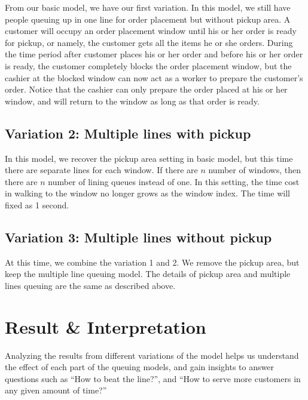 \documentclass[a4paper]{article}
\begin{document}
From our basic model, we have our first variation. In this model, we still have people queuing up in one line for order placement but without pickup area. A customer will occupy an order placement window until his or her order is ready for pickup, or namely, the customer gets all the items he or she orders. During the time period after customer places his or her order and before his or her order is ready, the customer completely blocks the order placement window, but the cashier at the blocked window can now act as a worker to prepare the customer's order. Notice that the cashier can only prepare the order placed at his or her window, and will return to the window as long as that order is ready.

\subsection{Variation 2: Multiple lines with pickup}

In this model, we recover the pickup area setting in basic model, but this time there are separate lines for each window. If there are $n$ number of windows, then there are $n$ number of lining queues instead of one. In this setting, the time cost in walking to the window no longer grows as the window index. The time will fixed as 1 second.

\subsection{Variation 3: Multiple lines without pickup}

At this time, we combine the variation 1 and 2. We remove the pickup area, but keep the multiple line queuing model. The details of pickup area and multiple lines queuing are the same as described above.

\newpage
\section{Result \& Interpretation}

Analyzing the results from different variations of the model helps us understand the effect of each part of the queuing models, and gain insights to answer questions such as ``How to beat the line?'', and ``How to serve more customers in any given amount of time?'' 
\end{document}
